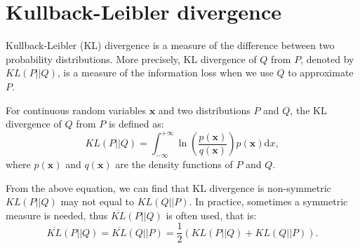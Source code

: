 \section{Kullback-Leibler divergence}
Kullback-Leibler (KL) divergence is a measure of the difference between two probability distributions. More precisely, KL divergence of $Q$ from $P$, denoted by $KL(P||Q)$, is a measure of the information loss when we use $Q$ to approximate $P$.

For continuous random variables $\mathbf{x}$ and two distributions $P$ and $Q$, the KL divergence of $Q$ from $P$ is defined as:
\begin{equation}
KL(P||Q) = \int_{-\infty}^{+\infty}\ln(\frac{p(\mathbf{x})}{q(\mathbf{x})})p(\mathbf{x})\mathrm{d}x,
\label{eq:kl}
\end{equation}
where $p(\mathbf{x})$ and $q(\mathbf{x})$ are the density functions of $P$ and $Q$.

From the above equation, we can find that KL divergence is non-symmetric \ie $KL(P||Q)$ may not equal to $KL(Q||P)$. In practice, sometimes a symmetric measure is needed, thus $\overline{KL}(P||Q)$ is often used, that is:
\begin{equation}
\overline{KL}(P||Q) = \overline{KL}(Q||P) = \frac{1}{2}(KL(P||Q) + KL(Q||P)).
\end{equation}
